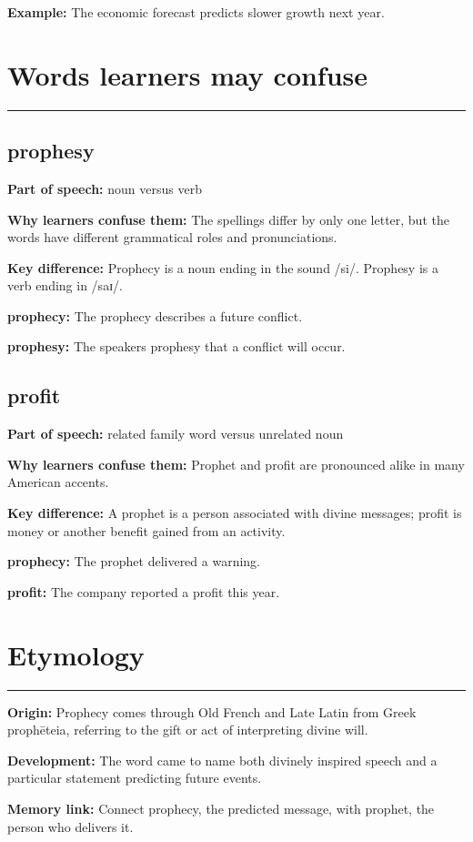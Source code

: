 \documentclass[11pt]{article}
\newcommand{\sectionrule}{\par\vspace{-0.5em}\noindent\textcolor{Accent}{\rule{\linewidth}{0.6pt}}\par}
\begin{document}
\textbf{Example:} The economic forecast predicts slower growth next year.

\section{Words learners may confuse}
\sectionrule
\subsection{prophesy}
\textbf{Part of speech:} noun versus verb

\textbf{Why learners confuse them:} The spellings differ by only one letter, but the words have different grammatical roles and pronunciations.

\textbf{Key difference:} Prophecy is a noun ending in the sound /si/. Prophesy is a verb ending in /saɪ/.

\textbf{prophecy:} The prophecy describes a future conflict.

\textbf{prophesy:} The speakers prophesy that a conflict will occur.

\subsection{profit}
\textbf{Part of speech:} related family word versus unrelated noun

\textbf{Why learners confuse them:} Prophet and profit are pronounced alike in many American accents.

\textbf{Key difference:} A prophet is a person associated with divine messages; profit is money or another benefit gained from an activity.

\textbf{prophecy:} The prophet delivered a warning.

\textbf{profit:} The company reported a profit this year.

\section{Etymology}
\sectionrule
\textbf{Origin:} Prophecy comes through Old French and Late Latin from Greek prophēteia, referring to the gift or act of interpreting divine will.

\textbf{Development:} The word came to name both divinely inspired speech and a particular statement predicting future events.

\textbf{Memory link:} Connect prophecy, the predicted message, with prophet, the person who delivers it.
\end{document}
